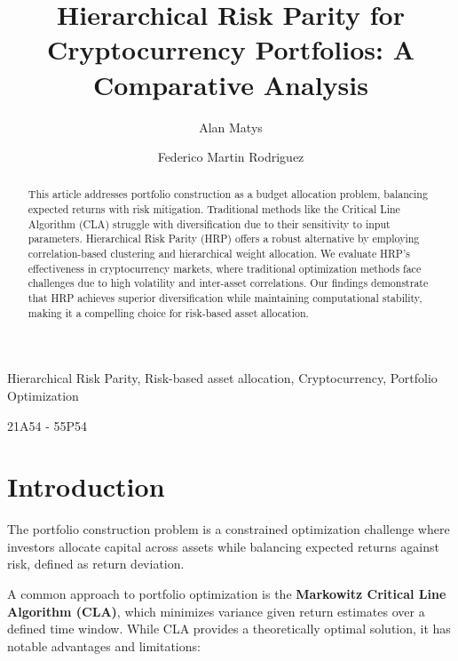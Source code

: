 \documentclass[english]{maciarticle}
\begin{document}
\title{Hierarchical Risk Parity for Cryptocurrency Portfolios: A Comparative Analysis}

\author[$\flat$]{Alan Matys}
\author[$\dag$]{Federico Martin Rodriguez}

\maketitle

\begin{abstract}
This article addresses portfolio construction as a budget allocation problem, balancing expected returns with risk mitigation. Traditional methods like the Critical Line Algorithm (CLA) struggle with diversification due to their sensitivity to input parameters. Hierarchical Risk Parity (HRP) offers a robust alternative by employing correlation-based clustering and hierarchical weight allocation. We evaluate HRP’s effectiveness in cryptocurrency markets, where traditional optimization methods face challenges due to high volatility and inter-asset correlations. Our findings demonstrate that HRP achieves superior diversification while maintaining computational stability, making it a compelling choice for risk-based asset allocation.
\end{abstract}

\begin{keywords}
Hierarchical Risk Parity, Risk-based asset allocation, Cryptocurrency, Portfolio Optimization
\end{keywords}

\begin{mathsubclass}
21A54 - 55P54
\end{mathsubclass}

{\thispagestyle{empty}} %

\section{Introduction}

The portfolio construction problem is a constrained optimization challenge where investors allocate capital across assets while balancing expected returns against risk, defined as return deviation.

A common approach to portfolio optimization is the \textbf{Markowitz Critical Line Algorithm (CLA)}, which minimizes variance given return estimates over a defined time window. While CLA provides a theoretically optimal solution, it has notable advantages and limitations:
\end{document}
